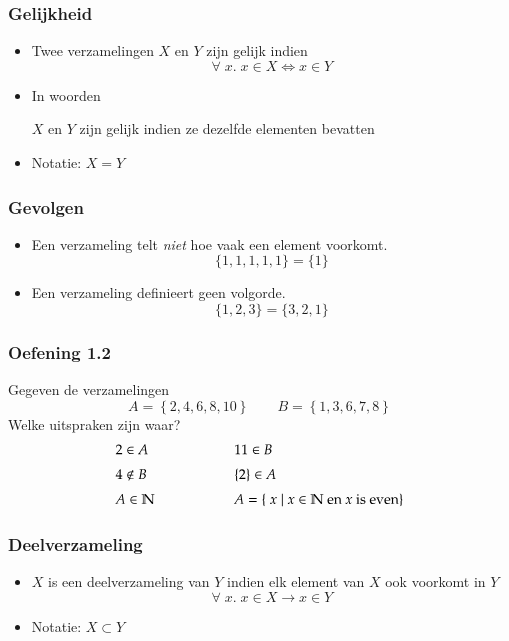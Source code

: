 \documentclass[dutch]{../khlslides}
\begin{document}
\begin{frame}
  \frametitle{Gelijkheid}
  \begin{itemize}
    \item Twee verzamelingen $X$ en $Y$ zijn gelijk indien
          \[ \forall \; x. \; x \in X \iff x \in Y \]
          \vskip5mm
    \item In woorden
          \begin{center}
            $X$ en $Y$ zijn gelijk indien ze dezelfde elementen bevatten
          \end{center}
          \vskip5mm
    \item Notatie: $X = Y$
  \end{itemize}
\end{frame}

\begin{frame}
  \frametitle{Gevolgen}
  \begin{itemize}
    \item Een verzameling telt \emph{niet} hoe vaak een element voorkomt.
          \[ \{ 1, 1, 1, 1, 1 \} = \{ 1 \} \]
    \item Een verzameling definieert geen volgorde.
          \[ \{ 1, 2, 3 \} = \{ 3, 2, 1 \} \]
  \end{itemize}
\end{frame}

\begin{frame}
  \frametitle{Oefening 1.2}
  Gegeven de verzamelingen
  \[
    A = \left\{ 2,4,6,8,10 \right\}
    \qquad
    B = \left\{ 1,3,6,7,8 \right\}
  \]
  Welke uitspraken zijn waar?
  \[
    \begin{array}{l@{\hspace{2cm}}l}
      2 \in A & 11 \in B \\[2mm]
      4 \not\in B & \left\{2\right\} \in A \\[2mm]
      A \in \mathbb{N} & A = \left\{ \; x \;|\; x \in \mathbb{N} \textrm{ en $x$ is even} \right\}
    \end{array}
  \]
\end{frame}

\begin{frame}
  \frametitle{Deelverzameling}
  \begin{center}
  \end{center}
  \begin{itemize}
    \item $X$ is een deelverzameling van $Y$ indien elk element van $X$ ook voorkomt in $Y$
          \[
            \forall \; x. \; x \in X \rightarrow x \in Y
          \]
    \item Notatie: $X \subset Y$
  \end{itemize}
\end{frame}
\end{document}
